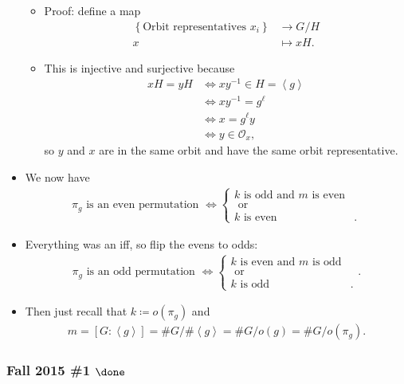 \begin{solution}
\begin{itemize}
  \begin{itemize}
  \tightlist
  \item
    Proof: define a map
    \begin{align*}
    \left\{{ \text{Orbit representatives } x_i }\right\} &\to G/H \\
    x &\mapsto xH
    .\end{align*}
  \item
    This is injective and surjective because
    \begin{align*}
    xH = yH &\iff xy^{-1}\in H = \left\langle{ g }\right\rangle \\
    &\iff xy^{-1}= g^\ell \\
    &\iff x=g^\ell y \\
    &\iff y\in {\mathcal{O}}_x
    ,\end{align*}
    so \(y\) and \(x\) are in the same orbit and have the same orbit
    representative.
  \end{itemize}
\item
  We now have
  \begin{align*}
  \pi_g \text{ is an even permutation } \iff 
  \begin{cases}
  k \text{ is odd and } m \text{ is even} &  
  \\
  \text{ or } & \\
  k \text{ is even}
   & .
  \end{cases}
  \end{align*}
\item
  Everything was an iff, so flip the evens to odds:
  \begin{align*}
  \pi_g \text{ is an odd permutation } \iff 
  \begin{cases}
  k \text{ is even and } m \text{ is odd} &  
  \\
  \text{ or } & \\
  k \text{ is odd}
   & .
  \end{cases}
  .\end{align*}
\item
  Then just recall that \(k\coloneqq o(\pi_g)\) and
  \begin{align*}
  m= [G: \left\langle{ g }\right\rangle] = \# G / \# \left\langle{ g }\right\rangle= \# G / o(g) = \# G/ o(\pi_g)
  .\end{align*}
\end{itemize}

\end{solution}

\hypertarget{fall-2015-1-done}{%
\subsubsection{\texorpdfstring{Fall 2015 \#1
\(\done\)}{Fall 2015 \#1 \textbackslash done}}\label{fall-2015-1-done}}

